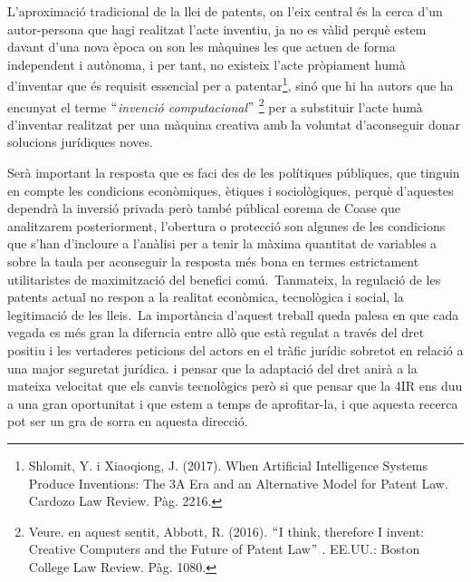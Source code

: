 \documentclass[12pt]{article}
\renewcommand{\_}{\kern-1.5pt\textunderscore\kern-1.5pt}
\begin{document}
\begin{itemize}
\vspace{\baselineskip}
\begin{justify}
L’aproximació tradicional de la llei de patents, on l’eix central és la cerca d’un autor-persona que hagi realitzat l’acte inventiu, ja no es vàlid perquè estem davant d’una nova època on son les màquines les que actuen de forma independent i autònoma, i per tant, no existeix l’acte pròpiament humà d’inventar que és requisit essencial per a patentar\footnote{ Shlomit, Y. i Xiaoqiong, J. (2017).  When Artificial Intelligence Systems Produce Inventions: The 3A Era and an Alternative Model for Patent Law. Cardozo Law Review. Pàg. 2216.  }, sinó que hi ha autors que ha encunyat el terme $``$\textit{invenció computacional}$"$ \footnote{ Veure. en aquest sentit, Abbott, R. (2016). $``$I think, therefore I invent: Creative Computers and the Future of Patent Law$"$ . EE.UU.: Boston College Law Review. Pàg. 1080.  } per a substituir l’acte humà d’inventar realitzat per una màquina creativa amb la voluntat d’aconseguir donar solucions jurídiques noves. 
\end{justify}\par


\vspace{\baselineskip}
\begin{justify}
Serà important la resposta que es faci des de les polítiques públiques, que tinguin en compte les condicions econòmiques, ètiques i sociològiques, perquè d’aquestes dependrà la inversió privada però també públical eorema de Coase que analitzarem posteriorment, l’obertura o protecció son algunes de les condicions que s’han d’incloure a l’anàlisi per a tenir la màxima quantitat de variables a sobre la taula per aconseguir la resposta més bona en termes estrictament utilitaristes de maximització del benefici comú.\  Tanmateix, la regulació de les patents actual no respon a la realitat econòmica, tecnològica i social, la legitimació de les lleis.\  La importància d’aquest treball queda palesa en que cada vegada es més gran la diferncia entre allò que està regulat a través del dret positiu i les vertaderes peticions del actors en el tràfic jurídic sobretot en relació a una major seguretat jurídica.  i pensar que la adaptació del dret anirà a la mateixa velocitat que els canvis tecnològics però si que  pensar que la 4IR ens duu a una gran oportunitat i que estem a temps de aprofitar-la, i que aquesta recerca pot ser un gra de sorra en aquesta direcció. 
\end{justify}\par



\end{itemize}
\end{document}
